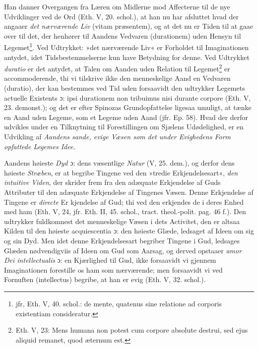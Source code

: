 \documentclass[12pt,a4paper]{book}
\newcommand{\opage}[1]{\marginnote{\footnotesize\textit{[#1]}}}
\begin{document}
Han danner Overgangen fra Læren om Midlerne mod
Affecterne til de nye Udviklinger ved de Ord (Eth. V, 20.
schol.), at han nu har afsluttet hvad der angaaer \emph{det nærværende
Liv} (vitam præsentem), og at det nu er Tiden
til at gaae over til det, der henhører til Aandens Vedvaren
(durationem) uden Hensyn til Legemet\footnote{jfr, Eth. V, 40. schol.: de mente, quatenus sine relatione ad corporis existentiam consideratur.}. Ved Udtrykket:
»det nærværende Liv« er Forholdet til Imaginationen antydet,
idet Tidsbestemmelserne kun have Betydning for
denne. Ved Udtrykket \emph{duratio} er det antydet, at Talen
om Aanden uden Relation til Legemet\footnote{Eth. V, 23: Mens humana non potest cum corpore absolute destrui,
sed ejus aliquid remanet, quod æternum est.} er accommoderende,
thi vi tilskrive ikke den menneskelige Aand en Vedvaren
(duratio), der kan bestemmes ved Tid uden forsaavidt den
udtrykker Legemets actuelle Existents ɔ: ipsi durationem
non tribuimus nisi durante corpore (Eth. V, 23. demonst.);
og det er efter Spinozas Grundopfattelse ligesaa%
 umuligt,
at tænke en Aand uden Legeme, som et Legeme uden
Aand (jfr. Ep. 58). Hvad der derfor udvikles under en Tilknytning
til Forestillingen om Sjælens Udødelighed, er en
Udvikling af \emph{Aandens sande, evige Væsen som det
under Evighedens Form opfattede Legemes Idee.}

Aandens høieste \emph{Dyd} ɔ: dens væsentlige \emph{Natur} (V,
25. dem.), og derfor dens høieste \emph{Stræben}, er at begribe
Tingene ved den »tredie Erkjendelsesart«, \emph{den intuitive}
\emph{Viden}, der skrider frem fra den adæquate Erkjendelse
af Guds Attributer til den adæquate Erkjendelse af Tingenes
Væsen. Denne Erkjendelse af Tingene er \emph{directe} Er\-%
\opage{167}\setcounter{footnote}{0}%
kjendelse af Gud; thi ved den erkjendes de i deres Enhed
med ham (Eth. V, 24, jfr. Eth. II, 45. schol., tract. theol.-polit. pag. 46 f.). Den udtrykker fuldkomnest det menneskelige
Væsen i dets Activitet, den er altsaa Kilden til den
høieste acquiescentia ɔ: den høieste Glæde, ledsaget af
Ideen om sig og sin Dyd. Men idet denne Erkjendelsesart%
begriber Tingene i Gud, ledsages Glæden nødvendigviis af
Ideen om Gud som Aarsag, og derved opstaaer \emph{amor Dei
intellectualis} ɔ: en Kjærlighed til Gud, ikke forsaavidt
vi gjennem Imaginationen forestille os ham som nærværende;
men forsaavidt vi ved Fornuften (intellectus) begribe, at han
er evig (Eth. V, 32. schol.).
\end{document}
